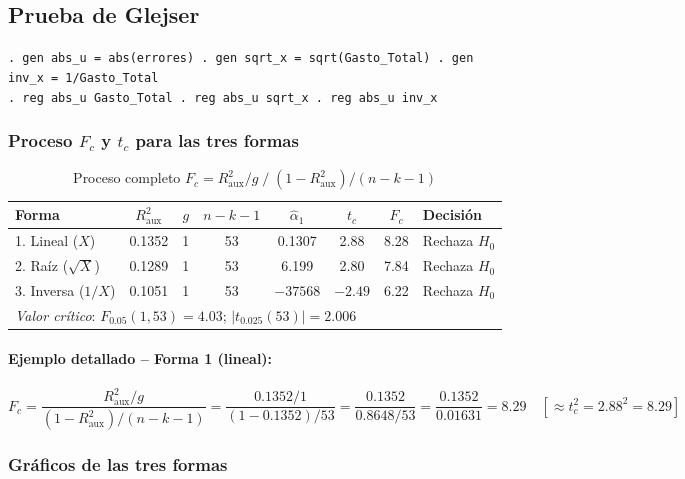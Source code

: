 \documentclass[12pt,a4paper]{article}
\begin{document}
\subsection{Prueba de Glejser}

\begin{cajacomando}[title=Stata -- Prueba de Glejser]
\texttt{. gen abs\_u = abs(errores) \quad . gen sqrt\_x = sqrt(Gasto\_Total) \quad . gen inv\_x = 1/Gasto\_Total}\\
\texttt{. reg abs\_u Gasto\_Total \quad . reg abs\_u sqrt\_x \quad . reg abs\_u inv\_x}
\end{cajacomando}

\subsubsection{Proceso $F_c$ y $t_c$ para las tres formas}

\begin{table}[H]
\centering
\caption{Proceso completo $F_c = R^2_{\text{aux}}/g \;\big/\; (1-R^2_{\text{aux}})/(n-k-1)$}
\begin{tabular}{lccccccl}
\toprule
\textbf{Forma} & $R^2_{\text{aux}}$ & $g$ & $n-k-1$ & $\hat{\alpha}_1$ & $t_c$ & $F_c$ & \textbf{Decisión}\\
\midrule
1. Lineal ($X$)     & 0.1352 & 1 & 53 & 0.1307 & 2.88 & 8.28 & Rechaza $H_0$\\
2. Raíz ($\sqrt{X}$) & 0.1289 & 1 & 53 & 6.199  & 2.80 & 7.84 & Rechaza $H_0$\\
3. Inversa ($1/X$)  & 0.1051 & 1 & 53 & $-37568$ & $-2.49$ & 6.22 & Rechaza $H_0$\\
\midrule
\multicolumn{7}{l}{\textit{Valor crítico}: $F_{0.05}(1,53) = 4.03$; $|t_{0.025}(53)| = 2.006$}\\
\bottomrule
\end{tabular}
\end{table}

\paragraph{Ejemplo detallado -- Forma 1 (lineal):}
\[
  F_c = \frac{R^2_{\text{aux}}/g}{(1-R^2_{\text{aux}})/(n-k-1)}
      = \frac{0.1352/1}{(1-0.1352)/53}
      = \frac{0.1352}{0.8648/53}
      = \frac{0.1352}{0.01631}
      = \mathbf{8.29} \quad [\approx t_c^2 = 2.88^2 = 8.29]
\]

\subsubsection{Gráficos de las tres formas}
\end{document}
